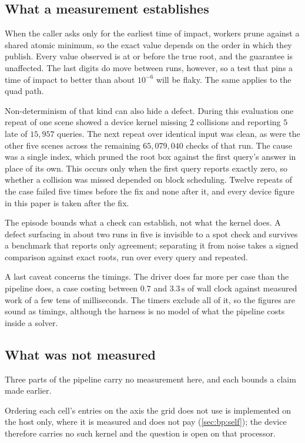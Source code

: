 \subsection{What a measurement establishes}

When the caller asks only for the earliest time of impact, workers prune against
a shared atomic minimum, so the exact value depends on the order in which they
publish. Every value observed is at or before the true root, and the guarantee
is unaffected. The last digits do move between runs, however, so a test that
pins a time of impact to better than about $10^{-6}$ will be flaky. The same
applies to the quad path.

Non-determinism of that kind can also hide a defect. During this evaluation one
repeat of one scene showed a device kernel missing $2$ collisions and reporting
$5$ late of $15{,}957$ queries. The next repeat over identical input was clean,
as were the other five scenes across the remaining $65{,}079{,}040$ checks of
that run. The cause was a
single index, which pruned the root box against the first query's answer in
place of its own. This occurs only when the first query reports exactly zero, so
whether a collision was missed depended on block scheduling. Twelve repeats of
the case failed five times before the fix and none after it, and every device
figure in this paper is taken after the fix.

The episode bounds what a check can establish, not what the kernel does. A
defect surfacing in about two runs in five is invisible to a spot check and
survives a benchmark that reports only agreement; separating it from noise takes
a signed comparison against exact roots, run over every query and repeated.

A last caveat concerns the timings. The driver does far more per case than the
pipeline does, a case costing between $0.7$ and $3.3\,\mathrm{s}$ of wall clock
against measured work of a few tens of milliseconds. The timers exclude all of
it, so the figures are sound as timings, although the harness is no model of
what the pipeline costs inside a solver.

\subsection{What was not measured}

Three parts of the pipeline carry no measurement here, and each bounds a claim
made earlier.

Ordering each cell's entries on the axis the grid does not use is implemented
on the host only, where it is measured and does not pay
(\cref{sec:bp:self}); the device therefore carries no such kernel and the
question is open on that processor.

